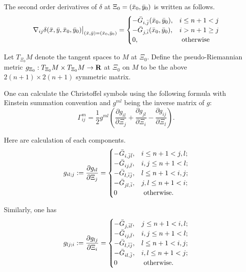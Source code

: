 The second order derivatives of $\delta$ at $\Xi_0 = (\bar{x}_0, \bar{y}_0)$ is written as follows.
\begin{equation}\label{pseudo_metric}
	\nabla_{ij} \delta (\bar{x}, \bar{y}, \bar{x}_0, \bar{y}_0){\big|}_{(\bar{x}, \bar{y}) = (\bar{x}_0, \bar{y}_0)}
	=\begin{cases}
	-\bar{G}_{i,\bar{j}}(\bar{x}_0, \bar{y}_0),& i\le n+1 < j\\
	-\bar{G}_{j, \bar{i}}(\bar{x}_0, \bar{y}_0),& i>n+1 \ge j\\
	0,& \text{ otherwise}
	\end{cases}
\end{equation}  

Let $T_{\Xi_0}M$ denote the tangent spaces to $M$ at ${\Xi_0}$. Define the pseudo-Riemannian metric $ g_{\Xi_0}: T_{\Xi_0}M\times T_{\Xi_0}M \rightarrow {\mathbf R}$ at $\Xi_0$ on $M$ to be the above $2(n+1) \times 2(n+1)$ symmetric matrix.\medskip

One can calculate the Christoffel symbols using the following formula with Einstein summation convention and $g^{ml}$ being the inverse matrix of $g$:
\begin{equation}\label{Gamma}
	\Gamma_{ij}^m = \frac{1}{2} g^{ml}(\frac{\partial g_{il}}{\partial \Xi_j} + \frac{\partial g_{jl}}{\partial \Xi_i} - \frac{\partial g_{ij}}{\partial \Xi_l}).
\end{equation}

Here are calculation of each components.
\begin{equation}
g_{il;j}:=	\frac{\partial g_{il}}{\partial \Xi_j} = \begin{cases}
-	\bar{G}_{i, \bar{j}\bar{l}}, & i \le n+1 < j, l; \\
-	\bar{G}_{ij, \bar{l}}, & i,j \le n+1 <l; \\
-	\bar{G}_{l, \bar{i}\bar{j}}, & l \le n+1 <i,j; \\
-	\bar{G}_{jl, \bar{i}}, & j,l \le  n+1<i ; \\
	0 & \text{ otherwise}.
	\end{cases}
\end{equation}

Similarly, one has
\begin{equation}
g_{lj;i}:=\frac{\partial g_{lj}}{\partial \Xi_i} = \begin{cases}
-\bar{G}_{j, \bar{i}\bar{l}}, & j \le n+1 < i, l; \\
-\bar{G}_{ij, \bar{l}}, & i,j \le n+1 <l; \\
-\bar{G}_{l, \bar{i}\bar{j}}, & l \le n+1 < i,j; \\
-\bar{G}_{il, \bar{j}}, &  i,l \le n+1 <j ; \\
0 & \text{ otherwise}.
\end{cases}
\end{equation}

